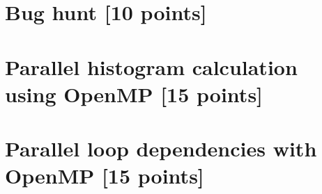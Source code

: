 \documentclass[unicode,11pt,a4paper,oneside,numbers=endperiod,openany]{scrartcl}
\begin{document}
\section{Bug hunt [10 points]}



\section{Parallel histogram calculation using OpenMP [15 points]} 


\section{Parallel loop dependencies with OpenMP [15 points]}
\end{document}

